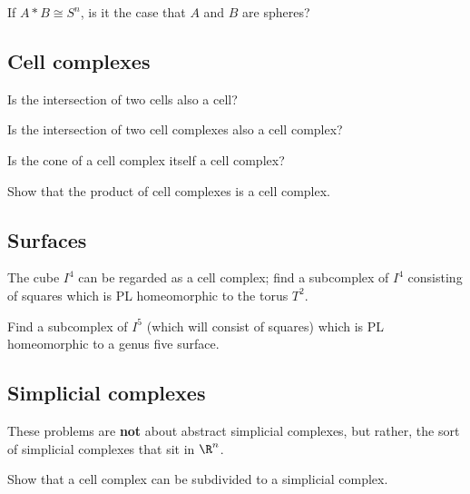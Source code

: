 \documentclass[12pt]{pset}
\newcommand{\join}{\ast}
\begin{document}
\begin{problem}
  If $A \join B \cong S^n$, is it the case that $A$ and $B$ are spheres?
\end{problem}

\subsection*{Cell complexes}

\begin{requiredproblem}
 Is the intersection of two cells also a cell?
\end{requiredproblem}

\begin{problem}
 Is the intersection of two cell complexes also a cell complex?
\end{problem}

\begin{problem}
  Is the cone of a cell complex itself a cell complex?
\end{problem}

\begin{requiredproblem}
  Show that the product of cell complexes is a cell complex.
\end{requiredproblem}

\subsection*{Surfaces}

\begin{requiredproblem}
 The cube $I^4$ can be regarded as a cell complex; find a subcomplex
 of $I^4$ consisting of squares which is PL homeomorphic to
 the torus $T^2$.
\end{requiredproblem}

\begin{problem}
  Find a subcomplex of $I^5$ (which will consist of squares) which is
  PL homeomorphic to a genus five surface.
\end{problem}

\subsection*{Simplicial complexes}

These problems are \textbf{not} about abstract simplicial complexes,
but rather, the sort of simplicial complexes that sit in $\R^n$.

\begin{problem}
  Show that a cell complex can be subdivided to a simplicial complex.
\end{problem}
\end{document}
